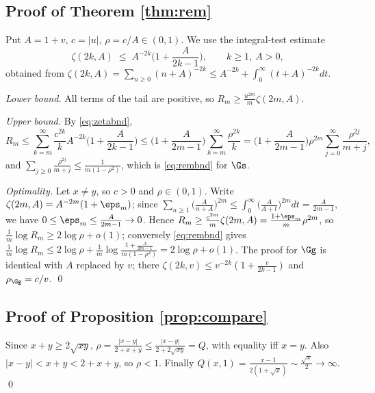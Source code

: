 \subsection{Proof of Theorem \ref{thm:rem}}
Put $A=1+v$, $c=|u|$, $\rho=c/A\in(0,1)$. We use the integral-test estimate
\begin{equation}\label{eq:zetabnd}
  \zeta(2k,A)\;\le\;A^{-2k}\Big(1+\frac{A}{2k-1}\Big),\qquad k\ge1,\ A>0,
\end{equation}
obtained from
$\zeta(2k,A)=\sum_{n\ge0}(n+A)^{-2k}\le A^{-2k}+\int_{0}^{\infty}(t+A)^{-2k}dt$.

\emph{Lower bound.} All terms of the tail are positive, so
$R_m\ge\frac{u^{2m}}{m}\zeta(2m,A)$.

\emph{Upper bound.} By \eqref{eq:zetabnd},
\[
  R_m\le\sum_{k=m}^{\infty}\frac{c^{2k}}{k}A^{-2k}\Big(1+\frac{A}{2k-1}\Big)
   \le\Big(1+\frac{A}{2m-1}\Big)\sum_{k=m}^{\infty}\frac{\rho^{2k}}{k}
   =\Big(1+\frac{A}{2m-1}\Big)\rho^{2m}\sum_{j=0}^{\infty}\frac{\rho^{2j}}{m+j},
\]
and $\sum_{j\ge0}\frac{\rho^{2j}}{m+j}\le\frac{1}{m(1-\rho^{2})}$, which is
\eqref{eq:rembnd} for $\Gs$.

\emph{Optimality.} Let $x\ne y$, so $c>0$ and $\rho\in(0,1)$. Write
$\zeta(2m,A)=A^{-2m}(1+\eps_m)$; since
$\sum_{n\ge1}\big(\frac{A}{n+A}\big)^{2m}\le\int_0^{\infty}\big(\frac{A}{A+t}\big)^{2m}dt
=\frac{A}{2m-1}$, we have $0\le\eps_m\le\frac{A}{2m-1}\to0$. Hence
$R_m\ge\frac{c^{2m}}{m}\zeta(2m,A)=\frac{1+\eps_m}{m}\rho^{2m}$, so
$\frac1m\log R_m\ge2\log\rho+o(1)$; conversely \eqref{eq:rembnd} gives
$\frac1m\log R_m\le2\log\rho+\frac1m\log\frac{1+\frac{A}{2m-1}}{m(1-\rho^{2})}
=2\log\rho+o(1)$. The proof for $\Gg$ is identical with $A$ replaced by $v$; there
$\zeta(2k,v)\le v^{-2k}(1+\frac{v}{2k-1})$ and $\rho_{\Gg}=c/v$. \qed

\subsection{Proof of Proposition \ref{prop:compare}}
Since $x+y\ge2\sqrt{xy}$, $\rho=\frac{|x-y|}{2+x+y}\le\frac{|x-y|}{2+2\sqrt{xy}}=Q$, with
equality iff $x=y$. Also $|x-y|<x+y<2+x+y$, so $\rho<1$. Finally
$Q(x,1)=\frac{x-1}{2(1+\sqrt x)}\sim\frac{\sqrt x}{2}\to\infty$. \qed

